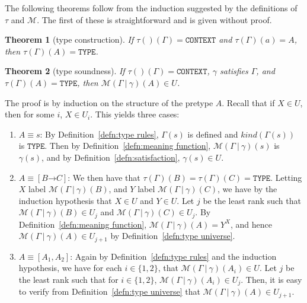 \documentclass [12pt,twoside]{cslreport}
\newcommand{\thmbox}
   {{\ \hfill\hbox{%
      \vrule width1.0ex height1.0ex
   }\parfillskip 0pt }}
\newenvironment{proof}{{\bf Proof. }}{\thmbox}
\newcommand{\aro}{\mathord\rightarrow} %
\newcommand{\funtype}[2]{[#1 \aro #2]}
\newcommand{\tupletype}[1]{[#1]}
\newcommand{\tauGamma}[1]{\tau(\Gamma)(#1)}
\newcommand{\Mgamma}[1]{{\mathcal M}(\Gamma\vbar\gamma)(#1)}
\newcommand{\listwo}[2]{#1_{1}, #1_{2}}
\newcommand{\tttype}{\mathtt{TYPE}}
\newcommand{\ttcontext}{\mathtt{CONTEXT}}
\newcommand{\itkind}{\textit{kind}}
\newcommand{\vbar}{\ |\ }
\newtheorem{theorem}{Theorem}
\begin{document}
The following theorems follow from the induction suggested by the
definitions of $\tau$ and $\mathcal{M}$.  The first of these
is straightforward and is given without proof.
\begin{theorem}[type construction]  \label{type construction}
If $\tau()(\Gamma) = \ttcontext$ and $\tauGamma{a} = A$, then
$\tauGamma{A} = \tttype$.
\end{theorem}
%
\begin{theorem}[type soundness]\label{simple-type-semantics}
 If $\tau()(\Gamma) = {\ttcontext}$, 
   $\gamma$ satisfies $\Gamma$, and
   $\tauGamma{A} = {\tttype{}} $, then 
$\Mgamma{A} \in U$\@.
\end{theorem}
\begin{proof}
The proof is by induction on the structure of the pretype $A$.
Recall that if $X\in U$, then for some $i$, $X \in U_i$\@.  
This yields three cases:
\begin{enumerate}
\item $A \equiv s$: By Definition~\ref{defn:type rules},
$\Gamma(s)$ is defined and $\itkind(\Gamma(s))$ is $\tttype$\@.
Then by Definition~\ref{defn:meaning function}, $\Mgamma{s}$
is $\gamma(s)$, and by Definition~\ref{defn:satisfaction},
$\gamma(s)\in U$\@.

\item $A\equiv \funtype{B}{C}$: We then have that $\tauGamma{B} =
\tauGamma{C} = \tttype$\@.  Letting $X$ label $\Mgamma{B}$, and $Y$ label
$\Mgamma{C}$, we have by the induction hypothesis that $X\in U$ and $Y\in
U$\@.  Let $j$ be the least rank such that $\Mgamma{B}\in U_j$ and
$\Mgamma{C}\in U_j$\@.  By Definition~\ref{defn:meaning function},
$\Mgamma{A} = Y^X$, and hence $\Mgamma{A} \in U_{j+1}$ by
Definition~\ref{defn:type universe}\@.

\item $A \equiv \tupletype{\listwo{A}{n}}$: Again by
Definition~\ref{defn:type rules} and the induction hypothesis, we have
for each $i \in \{1, 2\}$, that $\Mgamma{A_i}\in U$\@.  Let $j$ be the least
rank such that for $i\in \{1, 2\}$, $\Mgamma{A_i}\in U_j$\@.  Then,
it is easy to verify from Definition~\ref{defn:type universe} that
$\Mgamma{A}\in U_{j + 1}$\@.  
\end{enumerate}
\end{proof}
\end{document}
